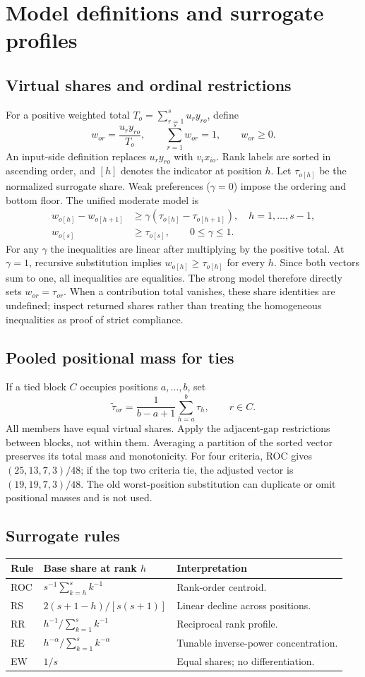 \documentclass[10pt,a4paper]{article}
\newcommand{\field}[1]{\needspace{3\baselineskip}\subsection*{#1}}
\begin{document}
\section{Model definitions and surrogate profiles}
\field{Virtual shares and ordinal restrictions}
For a positive weighted total $T_o=\sum_{r=1}^s u_r y_{ro}$, define
\[
w_{or}=\frac{u_r y_{ro}}{T_o},\qquad \sum_{r=1}^s w_{or}=1,\qquad w_{or}\geq 0.
\]
An input-side definition replaces $u_r y_{ro}$ with $v_i x_{io}$. Rank labels are sorted in ascending order, and $[h]$ denotes the indicator at position $h$. Let $\tau_{o[h]}$ be the normalized surrogate share. Weak preferences ($\gamma=0$) impose the ordering and bottom floor. The unified moderate model is
\begin{align*}
w_{o[h]}-w_{o[h+1]} &\geq \gamma(\tau_{o[h]}-\tau_{o[h+1]}),\quad h=1,\ldots,s-1,\\
w_{o[s]} &\geq \tau_{o[s]},\qquad 0\leq \gamma\leq 1.
\end{align*}
For any $\gamma$ the inequalities are linear after multiplying by the positive total. At $\gamma=1$, recursive substitution implies $w_{o[h]}\geq\tau_{o[h]}$ for every $h$. Since both vectors sum to one, all inequalities are equalities. The strong model therefore directly sets $w_{or}=\tau_{or}$. When a contribution total vanishes, these share identities are undefined; inspect returned shares rather than treating the homogeneous inequalities as proof of strict compliance.
\field{Pooled positional mass for ties}
If a tied block $C$ occupies positions $a,\ldots,b$, set
\[
\widetilde\tau_{or}=\frac{1}{b-a+1}\sum_{h=a}^{b}\tau_h,\qquad r\in C.
\]
All members have equal virtual shares. Apply the adjacent-gap restrictions between blocks, not within them. Averaging a partition of the sorted vector preserves its total mass and monotonicity. For four criteria, ROC gives $(25,13,7,3)/48$; if the top two criteria tie, the adjusted vector is $(19,19,7,3)/48$. The old worst-position substitution can duplicate or omit positional masses and is not used.
\field{Surrogate rules}
\begin{tabular}{@{}p{21mm}p{54mm}p{75mm}@{}}
\toprule
Rule & Base share at rank $h$ & Interpretation \\
\midrule
ROC & $s^{-1}\sum_{k=h}^s k^{-1}$ & Rank-order centroid. \\
RS & $2(s+1-h)/[s(s+1)]$ & Linear decline across positions. \\
RR & $h^{-1}/\sum_{k=1}^s k^{-1}$ & Reciprocal rank profile. \\
RE & $h^{-\alpha}/\sum_{k=1}^s k^{-\alpha}$ & Tunable inverse-power concentration. \\
EW & $1/s$ & Equal shares; no differentiation. \\
\bottomrule
\end{tabular}
\end{document}
